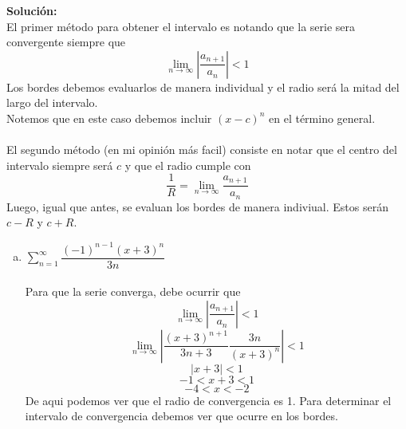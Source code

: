 \documentclass[12pt]{article}
\newenvironment{solucion}
{\begin{mdframed}[backgroundcolor=black!10]
		{\bf Solución:}\\
	}
	{
	\end{mdframed}
}
\newenvironment{preguntas}
{\begin{enumerate}\itemsep12pt
	}
	{
	\end{enumerate}
}
\newcommand{\ra}{\rightarrow}
\begin{document}
\begin{preguntas}
\begin{solucion}
El primer método para obtener el intervalo es notando que la serie sera convergente siempre que
$$\lim\limits_{n \ra \infty} \left|\dfrac{a_{n+1}}{a_n}\right| < 1$$
Los bordes debemos evaluarlos de manera individual y el radio será la mitad del largo del intervalo.\\
Notemos que en este caso debemos incluir $(x-c)^n$ en el término general.\\
\\
El segundo método (en mi opinión más facil) consiste en notar que el centro del intervalo siempre será $c$ y que el radio cumple con
$$\dfrac{1}{R} = \lim\limits_{n \ra \infty} \dfrac{a_{n+1}}{a_n}$$
Luego, igual que antes, se evaluan los bordes de manera indiviual. Estos serán $c-R$ y $c+R$.
\begin{enumerate}[a)]
\item $\sum\limits_{n=1}^{\infty}\dfrac{(-1)^{n-1}(x+3)^n}{3n}$\\
\\
Para que la serie converga, debe ocurrir que
$$\lim\limits_{n \ra \infty} \left|\dfrac{a_{n+1}}{a_n}\right| < 1$$
$$\lim\limits_{n \ra \infty} \left|\dfrac{(x+3)^{n+1}}{3n+3}\dfrac{3n}{(x+3)^n}\right| < 1$$
$$|x+3| < 1$$
$$-1 < x+3 < 1$$
$$-4 < x < -2$$
De aqui podemos ver que el radio de convergencia es 1. Para determinar el intervalo de convergencia debemos ver que ocurre en los bordes.


\end{enumerate}
\end{solucion}
\end{preguntas}
\end{document}
